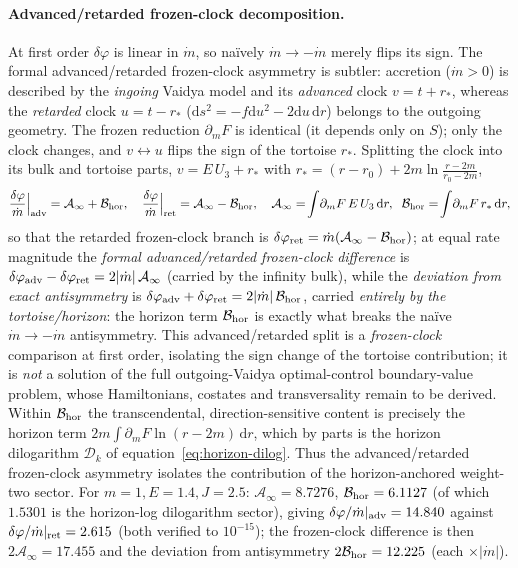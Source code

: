 \documentclass[12pt]{iopart}
\newcommand{\dd}{\mathrm{d}}
\theoremstyle{plain}
\theoremstyle{definition}
\theoremstyle{plain}
\theoremstyle{remark}
\begin{document}
\paragraph{Advanced/retarded frozen-clock decomposition.} At first order $\delta\varphi$ is
linear in $\dot m$, so na\"ively $\dot m\to-\dot m$ merely flips its sign. The
formal advanced/retarded frozen-clock asymmetry is subtler: accretion ($\dot m>0$) is
described by the \emph{ingoing} Vaidya model and its \emph{advanced} clock $v=t+r_*$,
whereas the \emph{retarded} clock $u=t-r_*$ ($\dd s^2=-f\dd u^2-2\dd u\,\dd r$) belongs to
the outgoing geometry. The frozen reduction $\partial_m F$ is identical
(it depends only on $S$); only the clock changes, and $v\leftrightarrow u$ flips the
sign of the tortoise $r_*$. Splitting the clock into its bulk and tortoise parts,
$v=E\,U_3+r_*$ with $r_*=(r-r_0)+2m\ln\!\frac{r-2m}{r_0-2m}$,
\begin{equation}
    \frac{\delta\varphi}{\dot m}\Big|_{\rm adv}=\mathcal{A}_\infty+\mathcal{B}_{\rm hor},
    \quad
    \frac{\delta\varphi}{\dot m}\Big|_{\rm ret}=\mathcal{A}_\infty-\mathcal{B}_{\rm hor},
    \quad
    \mathcal{A}_\infty=\!\int\!\partial_m F\,E\,U_3\,\dd r,\;\;
    \mathcal{B}_{\rm hor}=\!\int\!\partial_m F\,r_*\,\dd r,
    \label{eq:vaidya-asymmetry}
\end{equation}
so that the retarded frozen-clock branch is
$\delta\varphi_{\rm ret}=\dot m(\mathcal{A}_\infty-\mathcal{B}_{\rm hor})$; at equal
rate magnitude the \emph{formal advanced/retarded frozen-clock difference} is
$\delta\varphi_{\rm adv}-\delta\varphi_{\rm ret}=2|\dot m|\,\mathcal{A}_\infty$
(carried by the infinity bulk), while the \emph{deviation from exact antisymmetry} is
$\delta\varphi_{\rm adv}+\delta\varphi_{\rm ret}=2|\dot m|\,\mathcal{B}_{\rm hor}$,
carried \emph{entirely by the tortoise/horizon}: the horizon term $\mathcal{B}_{\rm hor}$
is exactly what breaks the na\"ive $\dot m\to-\dot m$ antisymmetry. This
advanced/retarded split is a \emph{frozen-clock} comparison at first order, isolating the
sign change of the tortoise contribution; it is \emph{not} a solution of the full
outgoing-Vaidya optimal-control boundary-value problem, whose Hamiltonians, costates and
transversality remain to be derived. Within
$\mathcal{B}_{\rm hor}$ the transcendental, direction-sensitive content is precisely
the horizon term $2m\!\int\!\partial_m F\ln(r-2m)\,\dd r$, which by parts is the
horizon dilogarithm $\mathcal{D}_k$ of equation~\eqref{eq:horizon-dilog}. Thus the
advanced/retarded frozen-clock asymmetry isolates the contribution of the
horizon-anchored weight-two sector. For
$m=1,E=1.4,J=2.5$: $\mathcal{A}_\infty=8.7276$, $\mathcal{B}_{\rm hor}=6.1127$ (of which
$1.5301$ is the horizon-log dilogarithm sector), giving
$\delta\varphi/\dot m|_{\rm adv}=14.840$ against
$\delta\varphi/\dot m|_{\rm ret}=2.615$ (both verified to $10^{-15}$); the frozen-clock
difference is then $2\mathcal{A}_\infty=17.455$ and the deviation from antisymmetry
$2\mathcal{B}_{\rm hor}=12.225$ (each $\times|\dot m|$).
\end{document}
